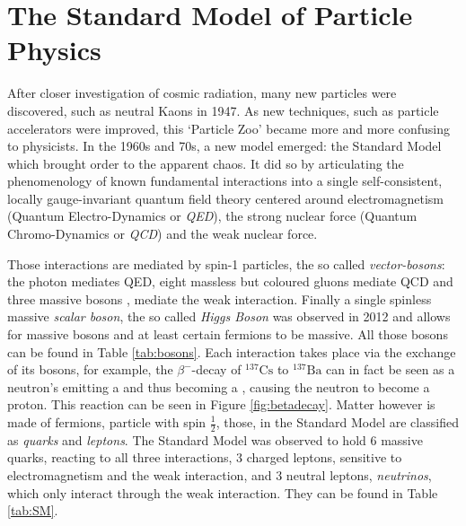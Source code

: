 
 
 \chapter{The Standard Model of Particle Physics}
 
 
 
After closer investigation of cosmic radiation, many new particles were discovered, such as neutral Kaons \PKzero in 1947. As new techniques, such as particle accelerators were improved, this `Particle Zoo' became more and more confusing to physicists. In the 1960s and 70s, a new model emerged: the Standard Model which brought order to the apparent chaos. It did so by articulating the phenomenology of known fundamental interactions into a single self-consistent, locally gauge-invariant quantum field theory centered around electromagnetism (Quantum Electro-Dynamics or \textit{QED}), the strong nuclear force (Quantum Chromo-Dynamics or \textit{QCD}) and the weak nuclear force.

Those interactions are mediated by spin-1 particles, the so called \textit{vector-bosons}: the photon \Pgamma mediates QED, eight massless but coloured gluons \Pgluon mediate QCD and three massive bosons \PZ, \PWpm mediate the weak interaction. Finally a single spinless massive \textit{scalar boson}, the so called \textit{Higgs Boson} was observed in 2012 and allows for massive bosons and at least certain fermions to be massive. All those bosons can be found in Table \ref{tab:bosons}. Each interaction takes place via the exchange of its bosons, for example, the $\beta^{-}$-decay of $^{137}\text{Cs}$ to $^{137}\text{Ba}$ can in fact be seen as a neutron's \Pdown emitting a \PWminus and thus becoming a \Pup, causing the neutron to become a proton. This reaction can be seen in Figure \ref{fig:betadecay}.
Matter however is made of fermions, particle with spin $\frac{1}{2}$, those, in the Standard Model are classified as \textit{quarks} and \textit{leptons}.
The Standard Model was observed to hold  6 massive quarks, reacting to all three interactions, 3 charged leptons, sensitive to electromagnetism and the weak interaction, and 3 neutral leptons, \textit{neutrinos}, which only interact through the weak interaction. They can be found in Table \ref{tab:SM}.

